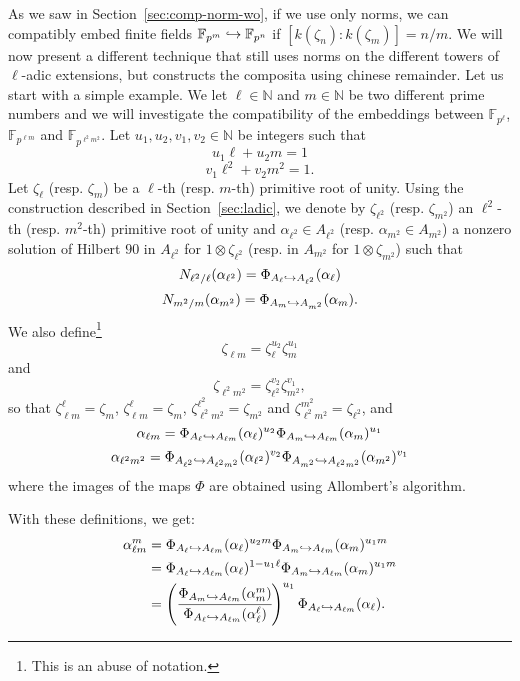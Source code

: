 \documentclass[a4paper,11pt]{article}
\begin{document}
As we saw in Section~\ref{sec:comp-norm-wo}, if we use only norms, we can 
compatibly embed finite fields $\mathbb{F}_{p^m}\hookrightarrow\mathbb{F}_{p^n}$ if
$[k(\zeta_n):k(\zeta_m)]=n/m$. We will now present a different technique that
still uses norms on the different towers of $\ell$-adic extensions, but
constructs the composita using chinese remainder. Let us start with a simple
example. We let $\ell\in\mathbb{N}$ and $m\in\mathbb{N}$ be two different prime numbers and we will
investigate the compatibility of the embeddings between $\mathbb{F}_{p^\ell}$,
$\mathbb{F}_{p^{\ell m}}$ and $\mathbb{F}_{p^{\ell^2 m^2}}$. Let $u_1, u_2, v_1,
v_2\in \mathbb{N}$ be integers such that
\[
  u_1\ell+u_2m=1
\]
\[
  v_1\ell^2+v_2m^2=1.
\]
Let $\zeta_\ell$ (resp. $\zeta_m$) be a $\ell$-th (resp. $m$-th) primitive root
of unity. Using the construction described in Section~\ref{sec:ladic}, we denote
by $\zeta_{\ell^2}$ (resp. $\zeta_{m^2}$) an $\ell^2$-th (resp. $m^2$-th)
primitive root of unity and $\alpha_{\ell^2}\in A_{\ell^2}$ (resp.
$\alpha_{m^2}\in A_{m^2}$) a nonzero solution of Hilbert $90$ in $A_{\ell^2}$
for $1\otimes\zeta_{\ell^2}$ (resp. in $A_{m^2}$ for $1\otimes\zeta_{m^2}$) such that
\[
  N_{\ell^2/\ell}(\alpha_{\ell^2})=\Phi_{A_\ell\hookrightarrow A_{\ell^2}}(\alpha_\ell)
\]
\[
  N_{m^2/m}(\alpha_{m^2})=\Phi_{A_m\hookrightarrow A_{m^2}}(\alpha_m).
\]
We also define\footnote{This is an abuse of notation.}
\[
  \zeta_{\ell m}=\zeta_\ell^{u_2}\zeta_{m}^{u_1}
\]
and
\[
  \zeta_{\ell^2 m^2}=\zeta_{\ell^2}^{v_2}\zeta_{m^2}^{v_1},
\]
so that $\zeta_{\ell m}^\ell = \zeta_m$, $\zeta_{\ell m}^\ell=\zeta_m$,
$\zeta_{\ell^2m^2}^{\ell^2}=\zeta_{m^2}$ and $\zeta_{\ell^2
m^2}^{m^2}=\zeta_{\ell^2}$, and
\[
  \alpha_{\ell m}=\Phi_{A_\ell\hookrightarrow A_{\ell m}}(\alpha_\ell)^{u_2}\Phi_{A_m\hookrightarrow
    A_{\ell m}}(\alpha_m)^{u_1}
\]
\[
  \alpha_{\ell^2 m^2}=\Phi_{A_{\ell^2}\hookrightarrow A_{\ell^2
  m^2}}(\alpha_{\ell^2})^{v_2}\Phi_{A_{m^2}\hookrightarrow
  A_{\ell^2 m^2}}(\alpha_{m^2})^{v_1}
\]
where the images of the maps $\Phi$ are obtained using Allombert's algorithm.

With these definitions, we get:
\begin{align*}
  \alpha_{\ell m}^m &= \Phi_{A_\ell\hookrightarrow A_{\ell m}}(\alpha_\ell)^{u_2m}\Phi_{A_m\hookrightarrow
    A_{\ell m}}(\alpha_m)^{u_1m} \\
  &= \Phi_{A_\ell\hookrightarrow A_{\ell m}}(\alpha_\ell)^{1-u_1\ell}\Phi_{A_m\hookrightarrow
    A_{\ell m}}(\alpha_m)^{u_1m} \\
    &= \left( \cfrac{\Phi_{A_m\hookrightarrow A_{\ell m}}(\alpha_{m}^m)}{\Phi_{A_\ell\hookrightarrow A_{\ell
    m}}(\alpha_\ell^\ell)}\right)^{u_1} \Phi_{A_\ell\hookrightarrow A_{\ell
    m}}(\alpha_\ell).
\end{align*}
\end{document}
